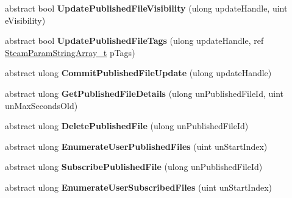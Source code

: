 \begin{DoxyCompactItemize}
abstract bool {\bfseries Update\+Published\+File\+Visibility} (ulong update\+Handle, uint e\+Visibility)
\item 
\mbox{\label{class_valve_1_1_steamworks_1_1_i_steam_remote_storage_a38818e94485c824f411240816944b3ce}} 
abstract bool {\bfseries Update\+Published\+File\+Tags} (ulong update\+Handle, ref \hyperlink{struct_valve_1_1_steamworks_1_1_steam_param_string_array__t}{Steam\+Param\+String\+Array\+\_\+t} p\+Tags)
\item 
\mbox{\label{class_valve_1_1_steamworks_1_1_i_steam_remote_storage_a938554afb76445e0e09a94e18460ed1d}} 
abstract ulong {\bfseries Commit\+Published\+File\+Update} (ulong update\+Handle)
\item 
\mbox{\label{class_valve_1_1_steamworks_1_1_i_steam_remote_storage_a14864fd24318aa4f3cd907bd219a3127}} 
abstract ulong {\bfseries Get\+Published\+File\+Details} (ulong un\+Published\+File\+Id, uint un\+Max\+Seconds\+Old)
\item 
\mbox{\label{class_valve_1_1_steamworks_1_1_i_steam_remote_storage_aa8a1fe3fdd3ccc500b3898d3fc88fc78}} 
abstract ulong {\bfseries Delete\+Published\+File} (ulong un\+Published\+File\+Id)
\item 
\mbox{\label{class_valve_1_1_steamworks_1_1_i_steam_remote_storage_a66fef2863f2efa34128813ac9e51a4e6}} 
abstract ulong {\bfseries Enumerate\+User\+Published\+Files} (uint un\+Start\+Index)
\item 
\mbox{\label{class_valve_1_1_steamworks_1_1_i_steam_remote_storage_a8cd0c80c658598cb9f3f513292956207}} 
abstract ulong {\bfseries Subscribe\+Published\+File} (ulong un\+Published\+File\+Id)
\item 
\mbox{\label{class_valve_1_1_steamworks_1_1_i_steam_remote_storage_a2f0dd4bb467db43353090f0b0867f0be}} 
abstract ulong {\bfseries Enumerate\+User\+Subscribed\+Files} (uint un\+Start\+Index)

\end{DoxyCompactItemize}
